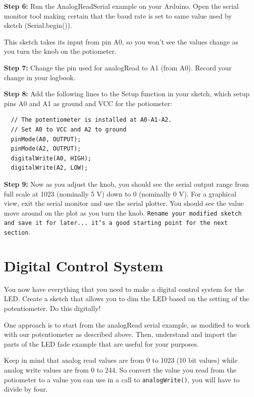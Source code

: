 \documentclass[12pt]{article}
\begin{document}
\vspace{0.5 cm}
\noindent
{\bf Step 6:} Run the AnalogReadSerial example on your Arduino.  Open
the serial monitor tool making certain that the baud rate is set to
same value used by sketch (Serial.begin()).

\vspace{0.5 cm}
This sketch takes its input from pin A0, so you won't see the values
change as you turn the knob on the potiometer.

\vspace{0.5 cm}
\noindent
{\bf Step 7:} Change the pin used for analogRead to A1 (from A0).  Record your change in your logbook.

\vspace{0.5 cm}
\noindent
{\bf Step 8:} Add the following lines to the Setup function in your sketch, which setup pins A0 and A1 as ground and VCC for the potiometer:
\begin{verbatim}    
  // The potentiometer is installed at A0-A1-A2.
  // Set A0 to VCC and A2 to ground
  pinMode(A0, OUTPUT);
  pinMode(A2, OUTPUT);
  digitalWrite(A0, HIGH);
  digitalWrite(A2, LOW);  
\end{verbatim}

\vspace{0.5 cm}
\noindent
{\bf Step 9:} Now as you adjust the knob, you should see the serial
output range from full scale at 1023 (nominally 5 V) down to 0
(nominally 0 V).  For a graphical view, exit the serial monitor and
use the serial plotter.  You should see the value move around on the
plot as you turn the knob.  {\tt Rename your modified sketch and save
  it for later... it's a good starting point for the next section}.
    
\section{Digital Control System}

You now have everything that you need to make a digital control system
for the LED.  Create a sketch that allows you to dim the LED based on
the setting of the potentiometer.  Do this digitally!

One approach is to start from the analogRead serial example, as
modified to work with our potentiometer as described above.  Then,
understand and import the parts of the LED fade example that are
useful for your purposes.

Keep in mind that analog read values are from 0 to 1023 (10 bit
values) while analog write values are from 0 to 244.  So convert the
value you read from the potiometer to a value you can use in a call to
{\tt analogWrite()}, you will have to divide by four.
\end{document}
